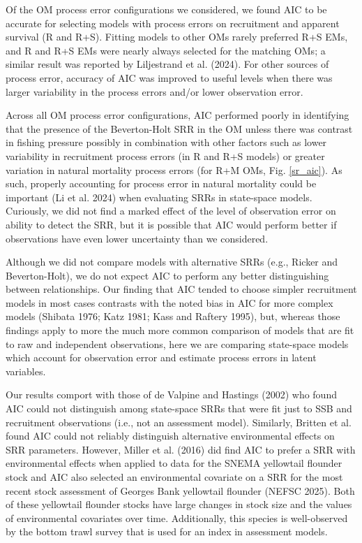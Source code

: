 \documentclass[
  12pt,
]{article}
\begin{document}
Of the OM process error configurations we considered, we found AIC to be
accurate for selecting models with process errors on recruitment and
apparent survival (R and R+S). Fitting models to other OMs rarely
preferred R+S EMs, and R and R+S EMs were nearly always selected for the
matching OMs; a similar result was reported by Liljestrand et al.
(2024). For other sources of process error, accuracy of AIC was improved
to useful levels when there was larger variability in the process errors
and/or lower observation error.

Across all OM process error configurations, AIC performed poorly in
identifying that the presence of the Beverton-Holt SRR in the OM unless
there was contrast in fishing pressure possibly in combination with
other factors such as lower variability in recruitment process errors
(in R and R+S models) or greater variation in natural mortality process
errors (for R+M OMs, Fig. \ref{sr_aic}). As such, properly accounting
for process error in natural mortality could be important (Li et al.
2024) when evaluating SRRs in state-space models. Curiously, we did not
find a marked effect of the level of observation error on ability to
detect the SRR, but it is possible that AIC would perform better if
observations have even lower uncertainty than we considered.

Although we did not compare models with alternative SRRs (e.g., Ricker
and Beverton-Holt), we do not expect AIC to perform any better
distinguishing between relationships. Our finding that AIC tended to
choose simpler recruitment models in most cases contrasts with the noted
bias in AIC for more complex models (Shibata 1976; Katz 1981; Kass and
Raftery 1995), but, whereas those findings apply to more the much more
common comparison of models that are fit to raw and independent
observations, here we are comparing state-space models which account for
observation error and estimate process errors in latent variables.

Our results comport with those of de Valpine and Hastings (2002) who
found AIC could not distinguish among state-space SRRs that were fit
just to SSB and recruitment observations (i.e., not an assessment
model). Similarly, Britten et al. found AIC could not reliably
distinguish alternative environmental effects on SRR parameters.
However, Miller et al. (2016) did find AIC to prefer a SRR with
environmental effects when applied to data for the SNEMA yellowtail
flounder stock and AIC also selected an environmental covariate on a SRR
for the most recent stock assessment of Georges Bank yellowtail flounder
(NEFSC 2025). Both of these yellowtail flounder stocks have large
changes in stock size and the values of environmental covariates over
time. Additionally, this species is well-observed by the bottom trawl
survey that is used for an index in assessment models.
\end{document}

